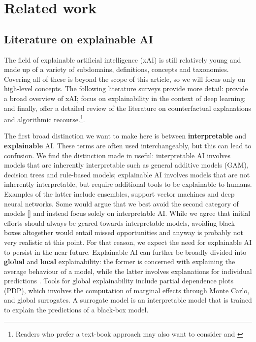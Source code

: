 \documentclass{juliacon}
\begin{document}
\hypertarget{sec-related}{%
\section{Related work}\label{sec-related}}

\hypertarget{literature-on-explainable-ai}{%
\subsection{Literature on explainable
AI}\label{literature-on-explainable-ai}}

The field of explainable artificial intelligence (xAI) is still
relatively young and made up of a variety of subdomains, definitions,
concepts and taxonomies. Covering all of these is beyond the scope of
this article, so we will focus only on high-level concepts. The
following literature surveys provide more detail:
\cite{arrieta2020explainable} provide a broad overview of xAI;
\cite{fan2020interpretability} focus on explainability in the context of
deep learning; and finally, \cite{karimi2020survey} offer a detailed
review of the literature on counterfactual explanations and algorithmic
recourse.\footnote{Readers who prefer a text-book approach may also want
  to consider \cite{molnar2020interpretable} and
  \cite{varshney2022trustworthy}}.

The first broad distinction we want to make here is between
\textbf{interpretable} and \textbf{explainable} AI. These terms are
often used interchangeably, but this can lead to confusion. We find the
distinction made in \cite{rudin2019stop} useful: interpretable AI
involves models that are inherently interpretable such as general
additive models (GAM), decision trees and rule-based models; explainable
AI involves models that are not inherently interpretable, but require
additional tools to be explainable to humans. Examples of the latter
include ensembles, support vector machines and deep neural networks.
Some would argue that we best avoid the second category of models
{[}\cite{rudin2019stop}{]} and instead focus solely on interpretable AI.
While we agree that initial efforts should always be geared towards
interpretable models, avoiding black boxes altogether would entail
missed opportunities and anyway is probably not very realistic at this
point. For that reason, we expect the need for explainable AI to persist
in the near future. Explainable AI can further be broadly divided into
\textbf{global} and \textbf{local} explainability: the former is
concerned with explaining the average behaviour of a model, while the
latter involves explanations for individual predictions
\cite{molnar2020interpretable}. Tools for global explainability include
partial dependence plots (PDP), which involves the computation of
marginal effects through Monte Carlo, and global surrogates. A surrogate
model is an interpretable model that is trained to explain the
predictions of a black-box model.
\end{document}
